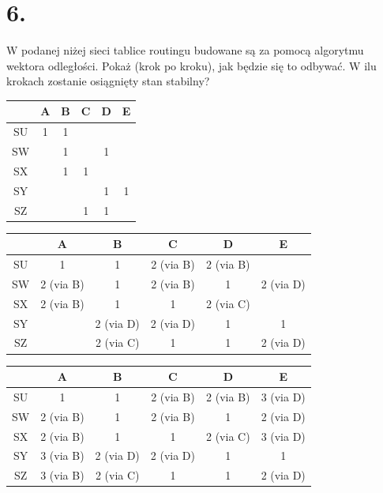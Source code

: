 \documentclass{article}
\begin{document}
\section*{6.}
W podanej niżej sieci tablice routingu budowane są za pomocą algorytmu wektora odległości. Pokaż (krok po kroku), jak będzie się to odbywać. W ilu krokach zostanie osiągnięty stan stabilny?
\newline
\begin{tabular}{ |c|c|c|c|c|c| }
    \hline
    & A & B & C & D & E \\ \hline
    SU & 1 & 1 &  &  &  \\ \hline
    SW &  & 1 &  & 1 &  \\ \hline
    SX &  & 1 & 1 &  &  \\ \hline
    SY &  &  &  & 1 & 1 \\ \hline
    SZ &  &  & 1 & 1 &  \\ 
    \hline
\end{tabular}
\newline
\begin{tabular}{ |c|c|c|c|c|c| }
    \hline
    & A & B & C & D & E \\ \hline
    SU & 1 & 1 & 2 (via B) & 2 (via B) &  \\ \hline
    SW & 2 (via B) & 1 & 2 (via B) & 1 & 2 (via D) \\ \hline
    SX & 2 (via B) & 1 & 1 & 2 (via C) &  \\ \hline
    SY &  & 2 (via D) & 2 (via D) & 1 & 1 \\ \hline
    SZ &  & 2 (via C) & 1 & 1 & 2 (via D) \\ 
    \hline
\end{tabular}
\newline
\begin{tabular}{ |c|c|c|c|c|c| }
    \hline
    & A & B & C & D & E \\ \hline
    SU & 1 & 1 & 2 (via B) & 2 (via B) & 3 (via D) \\ \hline
    SW & 2 (via B) & 1 & 2 (via B) & 1 & 2 (via D) \\ \hline
    SX & 2 (via B) & 1 & 1 & 2 (via C) & 3 (via D) \\ \hline
    SY & 3 (via B) & 2 (via D) & 2 (via D) & 1 & 1 \\ \hline
    SZ & 3 (via B) & 2 (via C) & 1 & 1 & 2 (via D) \\ 
    \hline
\end{tabular}
\end{document}
